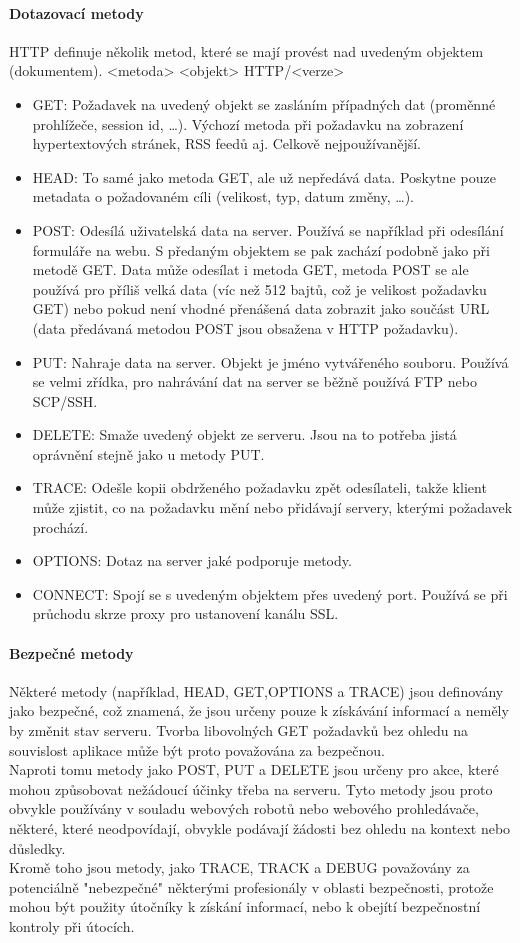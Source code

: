 \documentclass[10pt,a4paper]{article}
\begin{document}
\paragraph{Dotazovací metody} HTTP definuje několik metod, které se mají provést nad uvedeným objektem (dokumentem). <metoda> <objekt> HTTP/<verze>
\begin{itemize}
	\item GET: Požadavek na uvedený objekt se zasláním případných dat (proměnné prohlížeče, session id, …). Výchozí metoda při požadavku na zobrazení hypertextových stránek, RSS feedů aj. Celkově nejpoužívanější.
	\item HEAD: To samé jako metoda GET, ale už nepředává data. Poskytne pouze metadata o požadovaném cíli (velikost, typ, datum změny, …).
	\item POST: Odesílá uživatelská data na server. Používá se například při odesílání formuláře na webu. S předaným objektem se pak zachází podobně jako při metodě GET. Data může odesílat i metoda GET, metoda POST se ale používá pro příliš velká data (víc než 512 bajtů, což je velikost požadavku GET) nebo pokud není vhodné přenášená data zobrazit jako součást URL (data předávaná metodou POST jsou obsažena v HTTP požadavku).
	\item PUT: Nahraje data na server. Objekt je jméno vytvářeného souboru. Používá se velmi zřídka, pro nahrávání dat na server se běžně používá FTP nebo SCP/SSH.
	\item DELETE: Smaže uvedený objekt ze serveru. Jsou na to potřeba jistá oprávnění stejně jako u metody PUT.
	\item TRACE: Odešle kopii obdrženého požadavku zpět odesílateli, takže klient může zjistit, co na požadavku mění nebo přidávají servery, kterými požadavek prochází.
	\item OPTIONS: Dotaz na server jaké podporuje metody.
	\item CONNECT: Spojí se s uvedeným objektem přes uvedený port. Používá se při průchodu skrze proxy pro ustanovení kanálu SSL.
\end{itemize}
\paragraph{Bezpečné metody} Některé metody (například, HEAD, GET,OPTIONS a TRACE) jsou definovány jako bezpečné, což znamená, že jsou určeny pouze k získávání informací a neměly by změnit stav serveru. Tvorba libovolných GET požadavků bez ohledu na souvislost aplikace může být proto považována za bezpečnou. \\
Naproti tomu metody jako POST, PUT a DELETE jsou určeny pro akce, které mohou způsobovat nežádoucí účinky třeba na serveru. Tyto metody jsou proto obvykle používány v souladu webových robotů nebo webového prohledávače, některé, které neodpovídají, obvykle podávají žádosti bez ohledu na kontext nebo důsledky. \\
Kromě toho jsou metody, jako TRACE, TRACK a DEBUG považovány za potenciálně "nebezpečné" některými profesionály v oblasti bezpečnosti, protože mohou být použity útočníky k získání informací, nebo k obejítí bezpečnostní kontroly při útocích.
\end{document}
